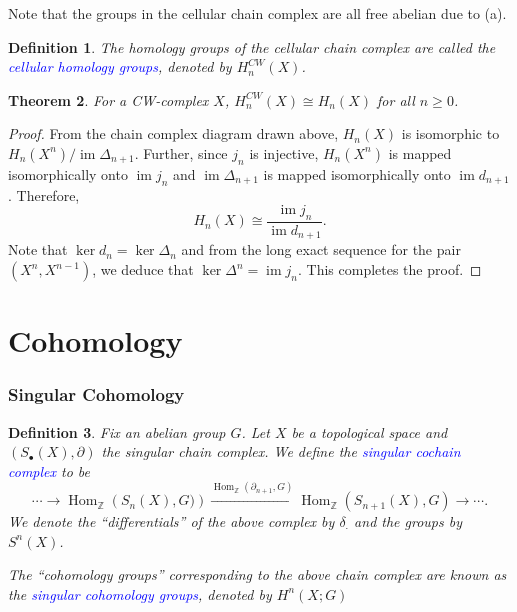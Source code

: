 \documentclass[10pt]{article}
\theoremstyle{thmstyle}
\newtheorem{theorem}{Theorem}[section]
\theoremstyle{defstyle}
\newtheorem{definition}[theorem]{Definition}
\newcommand{\Z}{\mathbb{Z}}
\newcommand{\im}{\operatorname{im}}
\newcommand{\Hom}{\operatorname{Hom}}
\newcommand{\define}[1]{\textcolor{blue}{\textit{#1}}}
\renewcommand{\ge}{\geqslant}
\begin{document}
Note that the groups in the cellular chain complex are all free abelian due to  (a).

\begin{definition}
    The homology groups of the {cellular chain complex} are called the \define{cellular homology groups}, denoted by $H^{CW}_n(X)$.
\end{definition}

\begin{theorem}
    For a CW-complex $X$, $H^{CW}_n(X)\cong H_n(X)$ for all $n\ge 0$.
\end{theorem}
\begin{proof}
    From the chain complex diagram drawn above, $H_n(X)$ is isomorphic to $H_n(X^n)/\im\Delta_{n + 1}$. Further, since $j_n$ is injective, $H_n(X^n)$ is mapped isomorphically onto $\im j_n$ and $\im\Delta_{n + 1}$ is mapped isomorphically onto $\im d_{n + 1}$. Therefore, 
    \begin{equation*}
        H_n(X)\cong\frac{\im j_n}{\im d_{n + 1}}.
    \end{equation*}
    Note that $\ker d_n = \ker\Delta_n$ and from the long exact sequence for the pair $(X^n, X^{n - 1})$, we deduce that $\ker\Delta^n = \im j_n$. This completes the proof.
\end{proof}

\part{Cohomology}

\section{Singular Cohomology}

\begin{definition}
    Fix an abelian group $G$. Let $X$ be a topological space and $(S_\bullet(X),\partial)$ the singular chain complex. We define the \define{singular cochain complex} to be 
    \begin{equation*}
        \cdots\to\Hom_{\Z}\left(S_n(X), G)\right)\xrightarrow{\Hom_{\Z}(\partial_{n + 1}, G)}\Hom_{\Z}\left(S_{n + 1}(X), G\right)\to\cdots.
    \end{equation*}
    We denote the ``differentials'' of the above complex by $\delta_\cdot$ and the groups by $S^n(X)$.
    
    The ``cohomology groups'' corresponding to the above chain complex are known as the \define{singular cohomology groups}, denoted by $H^n(X; G)$
\end{definition}
\end{document}
